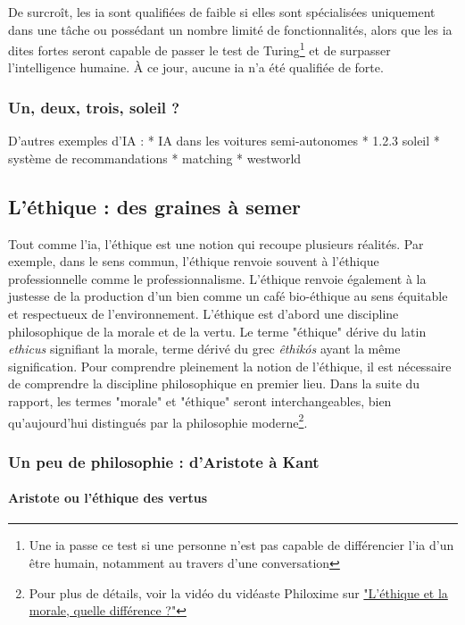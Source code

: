 De surcroît, les \gls{ia} sont qualifiées de faible si elles sont spécialisées uniquement dans une tâche ou possédant un nombre limité de fonctionnalités, alors que les \gls{ia} dites fortes seront capable de passer le test de Turing\footnote{Une \gls{ia} passe ce test si une personne n'est pas capable de différencier l'\gls{ia} d'un être humain, notamment au travers d'une conversation} et de surpasser l'intelligence humaine. À ce jour, aucune \gls{ia} n'a été qualifiée de forte.

\subsubsection{Un, deux, trois, soleil ?}


D'autres exemples d'IA :
* IA dans les voitures semi-autonomes
* 1.2.3 soleil
* système de recommandations
* matching
* westworld




\subsection{L'éthique : des graines à semer}\label{subsection:ethique}

Tout comme l'\gls{ia}, l'éthique est une notion qui recoupe plusieurs réalités. Par exemple, dans le sens commun, l'éthique renvoie souvent à l'éthique professionnelle comme le professionnalisme. L'éthique renvoie également à la justesse de la production d'un bien comme un café bio-éthique au sens équitable et respectueux de l'environnement.
L'éthique est d'abord une discipline philosophique de la morale et de la vertu. Le terme "éthique" dérive du latin \textit{ethicus} signifiant la morale, terme dérivé du grec \textit{êthikós} ayant la même signification. Pour comprendre pleinement la notion de l'éthique, il est nécessaire de comprendre la discipline philosophique en premier lieu. Dans la suite du rapport, les termes "morale" et "éthique" seront interchangeables, bien qu'aujourd'hui distingués par la philosophie moderne\footnote{Pour plus de détails, voir la vidéo du vidéaste Philoxime sur  \href{https://tournesol.app/entities/yt:HTAXqpMKm8M}{"L'éthique et la morale, quelle différence ?"}}.

\subsubsection{Un peu de philosophie : d'Aristote à Kant}

\paragraph{Aristote ou l'éthique des vertus}

